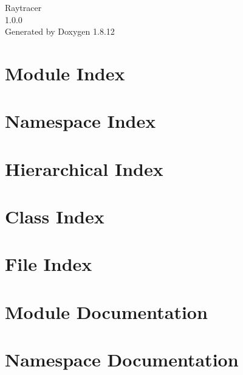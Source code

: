 \documentclass[twoside]{book}
\newcommand{\+}{\discretionary{\mbox{\scriptsize$\hookleftarrow$}}{}{}}
\newcommand{\clearemptydoublepage}{%
  \newpage{\pagestyle{empty}\cleardoublepage}%
}
\begin{document}
\hypersetup{pageanchor=false,
             bookmarksnumbered=true,
             pdfencoding=unicode
            }
\begin{titlepage}
\vspace*{7cm}
\begin{center}%
{\Large Raytracer \\[1ex]\large 1.\+0.\+0 }\\
\vspace*{1cm}
{\large Generated by Doxygen 1.8.12}\\
\end{center}
\end{titlepage}
\clearemptydoublepage
{}
\tableofcontents
\clearemptydoublepage
{}
\hypersetup{pageanchor=true}

\chapter{Module Index}

\chapter{Namespace Index}

\chapter{Hierarchical Index}

\chapter{Class Index}

\chapter{File Index}

\chapter{Module Documentation}








\chapter{Namespace Documentation}

\end{document}
